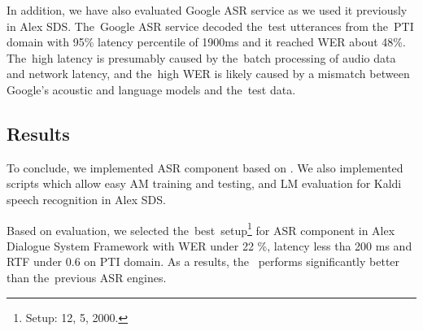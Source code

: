 In addition, we have also evaluated Google ASR service as we used it previously in Alex \ac{SDS}.
The~Google ASR service decoded the~test utterances from the~PTI domain with 95\% latency percentile of 1900ms and it reached WER about 48\%.
The~high latency is presumably caused by the~batch processing of audio data and network latency, and the~high WER is likely caused by a mismatch between Google's acoustic and language models and the~test data.

\subsection*{Results}
\label{sec:results}

To conclude, we implemented \ac{ASR} component based on .
We also implemented scripts which allow easy \ac{AM} training and testing, and \ac{LM} evaluation for Kaldi speech recognition in Alex \ac{SDS}.

Based on evaluation, we selected the~best~setup\footnote{Setup:  12,  5,  2000.} for ASR component in Alex Dialogue System Framework with  WER under 22 \%, latency less tha 200 ms and RTF under 0.6 on \ac{PTI} domain.
As a results, the~ performs significantly better than the~previous \ac{ASR} engines.

